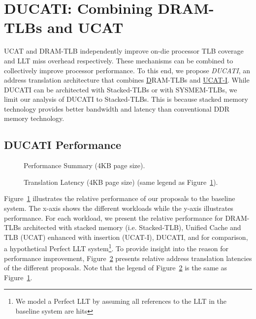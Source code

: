 \section{DUCATI: Combining DRAM-TLBs \newline and UCAT}
\label{sec:DUCATI}

\noindent UCAT and DRAM-TLB independently improve on-die processor TLB
coverage and LLT miss overhead respectively. These mechanisms can be
combined to collectively improve processor performance. To this end,
we propose {\em DUCATI}, an address translation architecture that
combines \underline{D}RAM-TLBs and \underline{UCAT-I}. While DUCATI
can be architected with Stacked-TLBs or with SYSMEM-TLBs, we limit our
analysis of DUCATI to Stacked-TLBs. This is because stacked memory
technology provides better bandwidth and latency than
conventional DDR memory technology.

\subsection{DUCATI Performance}

\begin{figure}[tp] 
\vspace{-0.1 in} \centering
\centerline{}

\caption{\small Performance Summary (4KB page size).\normalsize}
\label{fig:summary_4k_pages_perf} 
\vspace{0.1 in}
\end{figure}

\begin{figure}[tp] 
\vspace{0.07 in} \centering
\centerline{}

\caption{\small Translation Latency (4KB page size) (same legend as
  Figure~\ref{fig:summary_4k_pages_perf}).\normalsize}
\label{fig:summary_4k_pages_lat} 
\vspace{-0.2 in}
\end{figure}

\noindent Figure~\ref{fig:summary_4k_pages_perf} illustrates the
relative performance of our proposals to the baseline system. The
x-axis shows the different workloads while the y-axis illustrates
performance. For each workload, we present the relative performance
for DRAM-TLBs architected with stacked memory (i.e. Stacked-TLB),
Unified Cache and TLB (UCAT) enhanced with insertion (UCAT-I), DUCATI,
and for comparison, a hypothetical Perfect LLT system\footnote{We
model a Perfect LLT by assuming all references to the LLT in the
baseline system are hits}. To provide insight into the reason for
performance improvement, Figure~\ref{fig:summary_4k_pages_lat}
presents relative address translation latencies of the different
proposals. Note that the legend of
Figure~\ref{fig:summary_4k_pages_lat} is the same as
Figure~\ref{fig:summary_4k_pages_perf}.

